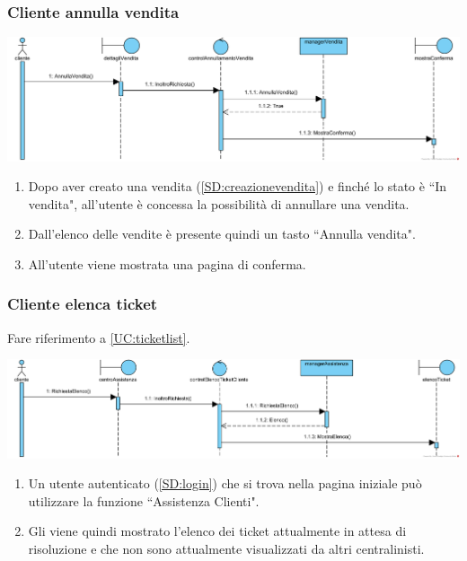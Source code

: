 \documentclass[12pt,a4paper]{article}
\begin{document}
\subsubsection{Cliente annulla vendita}
\label{SD:annullavendita}

\begin{center}
\includegraphics[width=\textwidth]{SequenceDiagram/ClienteVenditaAnnulla}
\end{center}

\begin{enumerate}
\item Dopo aver creato una vendita (\ref{SD:creazionevendita}) e finché lo stato è ``In vendita", all'utente è concessa la possibilità di annullare una vendita.
\item Dall'elenco delle vendite è presente quindi un tasto ``Annulla vendita".
\item All'utente viene mostrata una pagina di conferma.
\end{enumerate}

\newpage

\subsubsection{Cliente elenca ticket}
\label{SD:elencoticket}
Fare riferimento a \ref{UC:ticketlist}. \\

\begin{center}
\includegraphics[width=\textwidth]{SequenceDiagram/ClienteTicketElenco}
\end{center}

\begin{enumerate}
\item Un utente autenticato (\ref{SD:login}) che si trova nella pagina iniziale può utilizzare la funzione ``Assistenza Clienti".
\item Gli viene quindi mostrato l'elenco dei ticket attualmente in attesa di risoluzione e che non sono attualmente visualizzati da altri centralinisti.
\end{enumerate}
\end{document}
